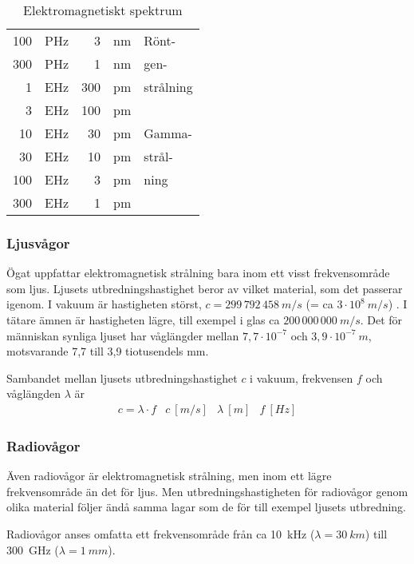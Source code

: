 \begin{table}
\begin{center}
\begin{tabular}{|rl|rl|l|}
100 & PHz &   3 & nm & Rönt-\\
300 & PHz &   1 & nm & gen-\\
  1 & EHz & 300 & pm & strålning\\ \cline{5-5}
  3 & EHz & 100 & pm & \\
 10 & EHz &  30 & pm & Gamma-\\
 30 & EHz &  10 & pm & strål-\\
100 & EHz &   3 & pm & ning\\
300 & EHz &   1 & pm & \\
\hline
\end{tabular}
\end{center}
\caption{Elektromagnetiskt spektrum}
\label{tab:elektromagnetiskt_spektrum}
\end{table}

\subsubsection{Ljusvågor}

Ögat uppfattar elektromagnetisk strålning bara inom ett visst frekvensområde
som ljus.
Ljusets utbredningshastighet beror av vilket material, som det passerar igenom.
I vakuum är hastigheten störst, \(c = 299\, 792\, 458\ m/s\)
(= ca \(3 \cdot 10^8\ m/s\)) \cite{SIbrochure8}.
I tätare ämnen är hastigheten lägre, till exempel i glas ca \(200\, 000\, 000\ m/s\).
Det för människan synliga ljuset har våglängder mellan \(7,7 \cdot 10^{-7}\)
och \(3,9 \cdot 10^{-7}\ m\), motsvarande 7,7 till 3,9 tiotusendels mm.

Sambandet mellan ljusets utbredningshastighet \(c\) i vakuum, frekvensen \(f\)
och våglängden \(\lambda\) är
\[
\begin{array}{llll}
c = \lambda \cdot f & c \ [m/s] & \lambda \ [m] & f \ [Hz]
\end{array}
\]
\subsubsection{Radiovågor}

Även radiovågor är elektromagnetisk strålning, men inom ett lägre
frekvensområde än det för ljus.
Men utbredningshastigheten för radiovågor genom olika material följer ändå
samma lagar som de för till exempel ljusets utbredning.

Radiovågor anses omfatta ett frekvensområde från ca 10~kHz
(\(\lambda = 30\ km\)) till 300~GHz (\(\lambda = 1\ mm\)).

